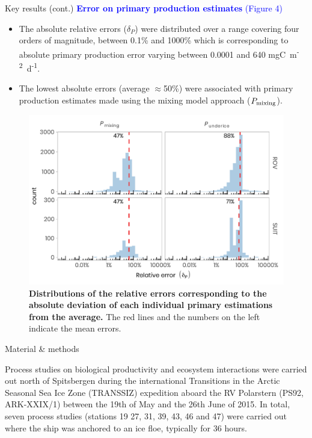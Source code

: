 \documentclass[final]{beamer}
\newlength{\colwidth}
\newcommand{\ppmixing}{\ensuremath{P_{\text{\scriptsize mixing}}}}
\newcommand{\dailypp}{mgC~m\textsuperscript{-2}~d\textsuperscript{-1}}
\begin{document}
\begin{frame}[t]
\begin{columns}[t]
\begin{column}{\colwidth}
\begin{block}{Key results (cont.)}
				\textcolor{blue}{\large \textbf{Error on primary production estimates} (Figure 4)}

				\begin{itemize}
					\justifying
					\setlength\itemsep{1em}
					\item The absolute relative errors ($\delta_P$) were distributed over a range covering four orders of magnitude, between 0.1\% and 1000\% which is corresponding to absolute primary production error varying between 0.0001 and 640 \dailypp{}.
					\item The lowest absolute errors (average $\approx$50\%) were associated with primary production estimates made using the mixing model approach (\ppmixing{}).
				\end{itemize}

				\begin{figure}
					\centering
					\includegraphics[scale = 1.75]{graphs/fig6.pdf}
					\caption{\textbf{Distributions of the relative errors corresponding to the absolute deviation of each individual primary estimations from the average.} The red lines and the numbers on the left indicate the mean errors.}
				\end{figure}

			\end{block}

			\vspace{-3.0cm}
			\begin{block}{\small Material \& methods}

				\footnotesize

				Process studies on biological productivity and ecosystem interactions were carried out north of Spitsbergen during the international Transitions in the Arctic Seasonal Sea Ice Zone (TRANSSIZ) expedition aboard the RV Polarstern (PS92, ARK-XXIX/1) between the 19th of May and the 26th June of 2015. In total, seven process studies (stations 19 27, 31, 39, 43, 46 and 47) were carried out where the ship was anchored to an ice floe, typically for 36 hours.


\end{block}
\end{column}
\end{columns}
\end{frame}
\end{document}
